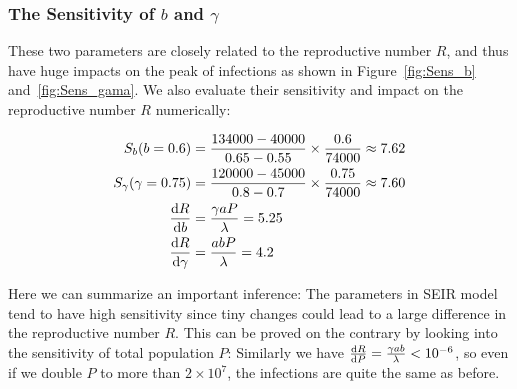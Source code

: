 \documentclass[12pt]{mcmthesis}
\begin{document}
\subsubsection{The Sensitivity of $b$ and $\gamma$}
These two parameters are closely related to the reproductive number $R$, and thus have huge impacts on the peak of  infections as shown in Figure~\ref{fig:Sens_b} and~\ref{fig:Sens_gama}. We also evaluate their sensitivity and impact on the reproductive number $R$ numerically:

\begin{align*}
    S_b(b = 0.6) &= \frac{134000 - 40000}{0.65 - 0.55} \times \frac{0.6}{74000} \approx 7.62\\
    S_{\gamma}(\gamma = 0.75) &= \frac{120000 - 45000}{0.8 - 0.7} \times \frac{0.75}{74000} \approx 7.60 \\
    \frac{{\rm d}R}{{\rm d}b} &= \frac{\gamma a P}{\lambda} = 5.25 \\
    \frac{{\rm d}R}{{\rm d}\gamma} &= \frac{a b P}{\lambda} = 4.2
\end{align*}

Here we can summarize an important inference: The parameters in SEIR model tend to have high sensitivity since tiny changes could lead to a large difference in the reproductive number $R$. This can be proved on the contrary by looking into the sensitivity of total population $P$: Similarly we have $\frac{{\rm d}R}{{\rm d}P} = \frac{\gamma a b}{\lambda} < 10^{-6}$, so even if we double $P$ to more than $2 \times 10^7$, the infections are quite the same as before.
\end{document}
